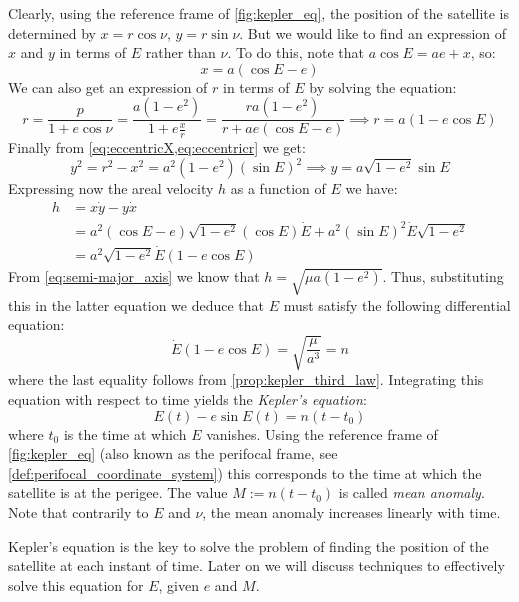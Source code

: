 \documentclass[../main.tex]{subfiles}
\begin{document}
Clearly, using the reference frame of \cref{fig:kepler_eq}, the position of the satellite is determined by $x=r\cos\nu$, $y=r\sin\nu$. But we would like to find an expression of $x$ and $y$ in terms of $E$ rather than $\nu$. To do this, note that $a\cos E=ae+x$, so:
\begin{equation}\label{eq:eccentricX}
  x=a(\cos E-e)
\end{equation}
We can also get an expression of $r$ in terms of $E$ by solving the equation:
\begin{equation}\label{eq:eccentricr}
  r=\frac{p}{1+e\cos \nu}=\frac{a(1-e^2)}{1+e\frac{x}{r}}=\frac{ra(1-e^2)}{r+ae(\cos E-e)}\implies r= a(1-e\cos E)
\end{equation}
Finally from \cref{eq:eccentricX,eq:eccentricr} we get:
\begin{equation}
  y^2=r^2-x^2=a^2(1-e^2){(\sin E)}^2\implies y=a\sqrt{1-e^2}\sin E
\end{equation}
Expressing now the areal velocity $h$ as a function of $E$ we have:
\begin{align}
  h & =x\dot{y}-y\dot{x}                                                           \\
    & =a^2(\cos E-e)\sqrt{1-e^2}(\cos E)\dot{E}+a^2{(\sin E)}^2\dot{E}\sqrt{1-e^2} \\
    & =a^2\sqrt{1-e^2}\dot{E}(1-e\cos E)
\end{align}
From \cref{eq:semi-major_axis} we know that $h=\sqrt{\mu a(1-e^2)}$. Thus, substituting this in the latter equation we deduce that $E$ must satisfy the following differential equation:
\begin{equation}\label{eq:kepler_equation_differential}
  \dot{E}(1-e\cos E)=\sqrt{\frac{\mu}{a^3}}=n
\end{equation}
where the last equality follows from \cref{prop:kepler_third_law}. Integrating this equation with respect to time yields the \emph{Kepler's equation}:
\begin{equation}\label{eq:kepler_equation}
  E(t)-e\sin E(t)=n(t-t_0)
\end{equation}
where $t_0$ is the time at which $E$ vanishes. Using the reference frame of \cref{fig:kepler_eq} (also known as the perifocal frame, see \cref{def:perifocal_coordinate_system}) this corresponds to the time at which the satellite is at the perigee. The value $M:=n(t-t_0)$ is called \emph{mean anomaly}. Note that contrarily to $E$ and $\nu$, the mean anomaly increases linearly with time.

Kepler's equation is the key to solve the problem of finding the position of the satellite at each instant of time. Later on we will discuss techniques to effectively solve this equation for $E$, given $e$ and $M$.
\end{document}
